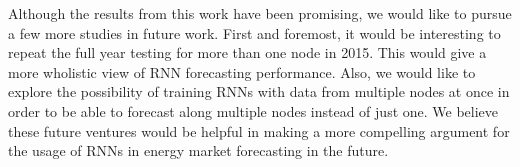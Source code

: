 \documentclass[sigconf]{acmart}
\begin{document}
Although the results from this work have been promising, we would like to pursue a few more studies in future work. First and foremost, it would be interesting to repeat the full year testing for more than one node in 2015. This would give a more wholistic view of RNN forecasting performance. Also, we would like to explore the possibility of training RNNs with data from multiple nodes at once in order to be able to forecast along multiple nodes instead of just one. We believe these future ventures would be helpful in making a more compelling argument for the usage of RNNs in energy market forecasting in the future.




\end{document}
